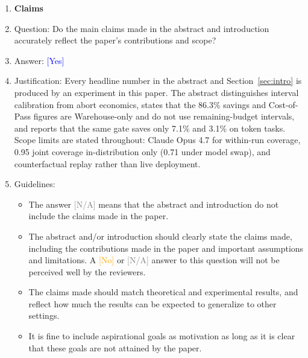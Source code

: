 \documentclass{article}
\providecommand{\answerYes}[1][]{\textcolor{blue}{[Yes] #1}}
\providecommand{\answerNo}[1][]{\textcolor{orange}{[No] #1}}
\providecommand{\answerNA}[1][]{\textcolor{gray}{[N/A] #1}}
\begin{document}
\begin{enumerate}

\item {\bf Claims}
    \item[] Question: Do the main claims made in the abstract and introduction accurately reflect the paper's contributions and scope?
    \item[] Answer: \answerYes{}
    \item[] Justification: Every headline number in the abstract and Section~\ref{sec:intro} is produced by an experiment in this paper. The abstract distinguishes interval calibration from abort economics, states that the 86.3\% savings and Cost-of-Pass figures are Warehouse-only and do not use remaining-budget intervals, and reports that the same gate saves only 7.1\% and 3.1\% on token tasks. Scope limits are stated throughout: Claude Opus 4.7 for within-run coverage, 0.95 joint coverage in-distribution only (0.71 under model swap), and counterfactual replay rather than live deployment.
    \item[] Guidelines:
    \begin{itemize}
        \item The answer \answerNA{} means that the abstract and introduction do not include the claims made in the paper.
        \item The abstract and/or introduction should clearly state the claims made, including the contributions made in the paper and important assumptions and limitations. A \answerNo{} or \answerNA{} answer to this question will not be perceived well by the reviewers.
        \item The claims made should match theoretical and experimental results, and reflect how much the results can be expected to generalize to other settings.
        \item It is fine to include aspirational goals as motivation as long as it is clear that these goals are not attained by the paper.
    \end{itemize}


\end{enumerate}
\end{document}
